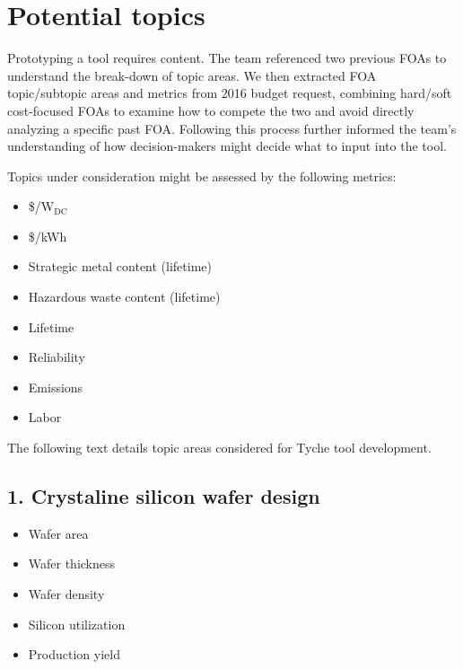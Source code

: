 \documentclass[letterpaper,10pt,english]{sphinxmanual}
\begin{document}
\section{Potential topics}
\label{\detokenize{mock-foa:potential-topics}}
Prototyping a tool requires content. The team referenced two previous
FOAs to understand the break-down of topic areas. We then extracted FOA
topic/subtopic areas and metrics from 2016 budget request, combining
hard/soft cost-focused FOAs to examine how to compete the two and avoid
directly analyzing a specific past FOA. Following this process further
informed the team’s understanding of how decision-makers might decide
what to input into the tool.

Topics under consideration might be assessed by the following metrics:
\begin{itemize}
\item {} 
\$/W$_{\text{DC}}$

\item {} 
\$/kWh

\item {} 
Strategic metal content (lifetime)

\item {} 
Hazardous waste content (lifetime)

\item {} 
Lifetime

\item {} 
Reliability

\item {} 
Emissions

\item {} 
Labor

\end{itemize}

The following text details topic areas considered for Tyche tool
development.


\subsection{1. Crystaline silicon wafer design}
\label{\detokenize{mock-foa:crystaline-silicon-wafer-design}}\begin{itemize}
\item {} 
Wafer area

\item {} 
Wafer thickness

\item {} 
Wafer density

\item {} 
Silicon utilization

\item {} 
Production yield

\end{itemize}
\end{document}
